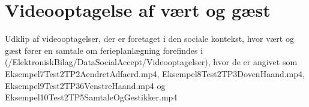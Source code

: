 \section{Videooptagelse af vært og gæst}
\label{app:VideooptagelseVaertOgGaest}
%
Udklip af videooptagelser, der er foretaget i den sociale kontekst, hvor vært og gæst fører en samtale om ferieplanlægning forefindes i (/ElektroniskBilag/DataSocialAccept/Videooptagelser), hvor de er angivet som Eksempel7Test2TP2AendretAdfaerd.mp4, Eksempel8Test2TP3DovenHaand.mp4, Eksempel9Test2TP36VenstreHaand.mp4 og Eksempel10Test2TP5SamtaleOgGestikker.mp4
%

